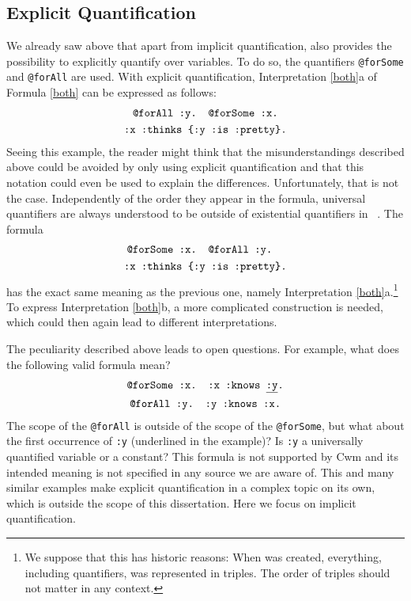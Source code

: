 \subsection{Explicit Quantification}\label{remarkExplicitQuantification}
We already saw above that apart from implicit quantification, \nthreelogic also provides the possibility to explicitly quantify over variables.
To do so, the quantifiers \verb!@forSome!
and \verb!@forAll! are used. With explicit quantification, Interpretation \ref{both}a of Formula \ref{both} can be expressed as follows:
\begin{multline}\notag
 \texttt{@forAll :y. @forSome :x.}\\\texttt{:x :thinks \{:y :is :pretty\}.}
\end{multline}
Seeing this example, the reader might think that the misunderstandings described above could be avoided by only using explicit quantification and that this notation could 
even be used to explain the differences. Unfortunately, that is not the case. Independently of the order they appear in the formula, universal quantifiers are always understood to
be outside of  existential quantifiers in \nthree~\cite{Notation3}.
The formula
\begin{multline}\notag
 \texttt{@forSome :x. @forAll :y. }\\\texttt{:x :thinks \{:y :is :pretty\}.}
\end{multline}
has the exact same meaning as the previous one, namely Interpretation \ref{both}a.\footnote{We suppose that this has historic reasons: 
When \nthree was created, everything, including quantifiers,  was represented in triples. The order of triples should not matter in any context.}
To express Interpretation \ref{both}b, a more complicated 
construction is needed, which could then again lead to different interpretations. 

The peculiarity described above leads to open questions. %
For example, what does the following valid \nthree formula mean?
\begin{multline}
 \texttt{@forSome :x. :x :knows \underline{:y}.}\\ \texttt{@forAll :y. :y :knows :x.}
\end{multline}
The scope of the \texttt{@forAll} is outside of the scope of the \texttt{@forSome}, but what about the first occurrence of \texttt{:y} (underlined in the example)? Is \texttt{:y} a universally 
quantified variable or a constant?
This formula is not supported by Cwm and its intended meaning is not specified in any source we are aware of. 
This and many similar examples make explicit quantification in \nthree a complex topic on its own, which is outside 
the scope of this dissertation. Here we focus on implicit quantification.